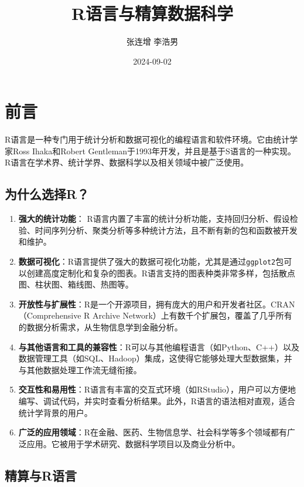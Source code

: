 \documentclass[
]{book}
\title{R语言与精算数据科学}
\author{张连增 \quad 李浩男}
\date{2024-09-02}
\begin{document}
\maketitle

{
\setcounter{tocdepth}{1}
\tableofcontents
}
\chapter{前言}\label{ux524dux8a00}

R语言是一种专门用于统计分析和数据可视化的编程语言和软件环境。它由统计学家Ross Ihaka和Robert Gentleman于1993年开发，并且是基于S语言的一种实现。R语言在学术界、统计学界、数据科学以及相关领域中被广泛使用。

\section{为什么选择R？}\label{ux4e3aux4ec0ux4e48ux9009ux62e9r}

\begin{enumerate}
\def\labelenumi{\arabic{enumi}.}
\item
  \textbf{强大的统计功能}： R语言内置了丰富的统计分析功能，支持回归分析、假设检验、时间序列分析、聚类分析等多种统计方法，且不断有新的包和函数被开发和维护。
\item
  \textbf{数据可视化}：R语言提供了强大的数据可视化功能，尤其是通过\texttt{ggplot2}包可以创建高度定制化和复杂的图表。R语言支持的图表种类非常多样，包括散点图、柱状图、箱线图、热图等。
\item
  \textbf{开放性与扩展性}：R是一个开源项目，拥有庞大的用户和开发者社区。CRAN（Comprehensive R Archive Network）上有数千个扩展包，覆盖了几乎所有的数据分析需求，从生物信息学到金融分析。
\item
  \textbf{与其他语言和工具的兼容性}：R可以与其他编程语言（如Python、C++）以及数据管理工具（如SQL、Hadoop）集成，这使得它能够处理大型数据集，并与其他数据处理工作流无缝衔接。
\item
  \textbf{交互性和易用性}：R语言有丰富的交互式环境（如RStudio），用户可以方便地编写、调试代码，并实时查看分析结果。此外，R语言的语法相对直观，适合统计学背景的用户。
\item
  \textbf{广泛的应用领域}：R在金融、医药、生物信息学、社会科学等多个领域都有广泛应用。它被用于学术研究、数据科学项目以及商业分析中。
\end{enumerate}

\section{精算与R语言}\label{ux7cbeux7b97ux4e0erux8bedux8a00}
\end{document}

